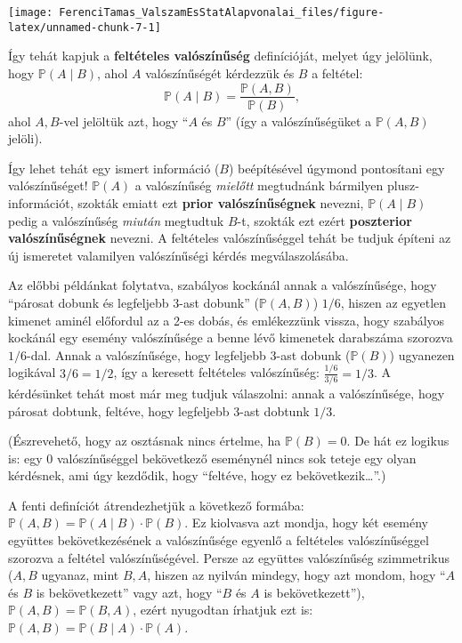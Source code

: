 \documentclass[magyar,]{book}
\begin{document}
\begin{center}\texttt{[image: FerenciTamas\_ValszamEsStatAlapvonalai\_files/figure-latex/unnamed-chunk-7-1]} \end{center}

Így tehát kapjuk a \textbf{feltételes valószínűség} definícióját, melyet úgy jelölünk, hogy \(\mathbb{P}\left(A \mid B\right)\), ahol \(A\) valószínűségét kérdezzük és \(B\) a feltétel:
\[
\mathbb{P}\left(A \mid B\right) = \frac{\mathbb{P}\left(A,B\right)}{\mathbb{P}\left(B\right)},
\]
ahol \(A,B\)-vel jelöltük azt, hogy \enquote{\(A\) és \(B\)} (így a valószínűségüket a \(\mathbb{P}\left(A,B\right)\) jelöli).

Így lehet tehát egy ismert információ (\(B\)) beépítésével úgymond pontosítani egy valószínűséget! \(\mathbb{P}\left(A\right)\) a valószínűség \emph{mielőtt} megtudnánk bármilyen plusz-információt, szokták emiatt ezt \textbf{prior valószínűségnek} nevezni, \(\mathbb{P}\left(A \mid B\right)\) pedig a valószínűség \emph{miután} megtudtuk \(B\)-t, szokták ezt ezért \textbf{poszterior valószínűségnek} nevezni. A feltételes valószínűséggel tehát be tudjuk építeni az új ismeretet valamilyen valószínűségi kérdés megválaszolásába.

Az előbbi példánkat folytatva, szabályos kockánál annak a valószínűsége, hogy \enquote{párosat dobunk és legfeljebb 3-ast dobunk} (\(\mathbb{P}\left(A,B\right)\)) \(1/6\), hiszen az egyetlen kimenet aminél előfordul az a 2-es dobás, és emlékezzünk vissza, hogy szabályos kockánál egy esemény valószínűsége a benne lévő kimenetek darabszáma szorozva \(1/6\)-dal. Annak a valószínűsége, hogy legfeljebb 3-ast dobunk (\(\mathbb{P}\left(B\right)\)) ugyanezen logikával \(3/6=1/2\), így a keresett feltételes valószínűség: \(\frac{1/6}{3/6}=1/3\). A kérdésünket tehát most már meg tudjuk válaszolni: annak a valószínűsége, hogy párosat dobtunk, feltéve, hogy legfeljebb 3-ast dobtunk \(1/3\).

(Észrevehető, hogy az osztásnak nincs értelme, ha \(\mathbb{P}\left(B\right)=0\). De hát ez logikus is: egy 0 valószínűséggel bekövetkező eseménynél nincs sok teteje egy olyan kérdésnek, ami úgy kezdődik, hogy \enquote{feltéve, hogy ez bekövetkezik\ldots{}}.)

A fenti definíciót átrendezhetjük a következő formába: \(\mathbb{P}\left(A,B\right)=\mathbb{P}\left(A \mid B\right)\cdot \mathbb{P}\left(B\right)\). Ez kiolvasva azt mondja, hogy két esemény együttes bekövetkezésének a valószínűsége egyenlő a feltételes valószínűséggel szorozva a feltétel valószínűségével. Persze az együttes valószínűség szimmetrikus (\(A,B\) ugyanaz, mint \(B,A\), hiszen az nyilván mindegy, hogy azt mondom, hogy \enquote{\(A\) és \(B\) is bekövetkezett} vagy azt, hogy \enquote{\(B\) és \(A\) is bekövetkezett}), \(\mathbb{P}\left(A,B\right)=\mathbb{P}\left(B,A\right)\), ezért nyugodtan írhatjuk ezt is: \(\mathbb{P}\left(A,B\right)=\mathbb{P}\left(B \mid A\right)\cdot \mathbb{P}\left(A\right)\).
\end{document}
